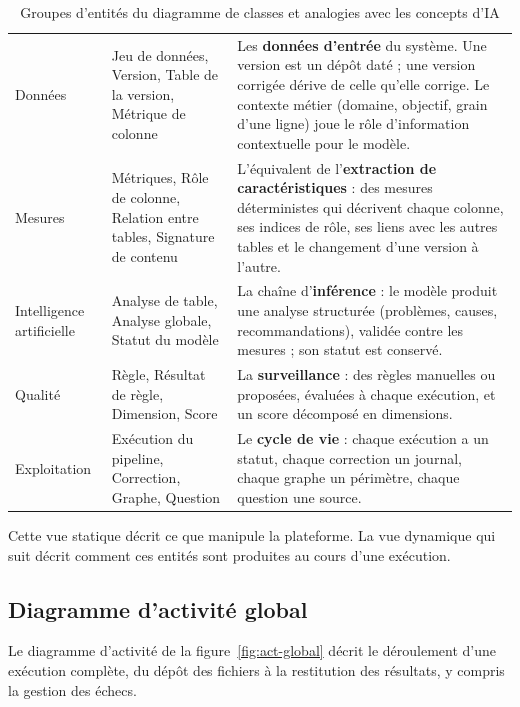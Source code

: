\begin{table}[H]
\centering
\small
\begin{tabular}{|L{2.8cm}|L{4.2cm}|L{7cm}|}
\hline
{} &  &  \\ \hline
Données & Jeu de données, Version, Table de la version, Métrique de colonne & Les \textbf{données d'entrée} du système. Une version est un dépôt daté ; une version corrigée dérive de celle qu'elle corrige. Le contexte métier (domaine, objectif, grain d'une ligne) joue le rôle d'information contextuelle pour le modèle. \\ \hline
Mesures & Métriques, Rôle de colonne, Relation entre tables, Signature de contenu & L'équivalent de l'\textbf{extraction de caractéristiques} : des mesures déterministes qui décrivent chaque colonne, ses indices de rôle, ses liens avec les autres tables et le changement d'une version à l'autre. \\ \hline
Intelligence artificielle & Analyse de table, Analyse globale, Statut du modèle & La chaîne d'\textbf{inférence} : le modèle produit une analyse structurée (problèmes, causes, recommandations), validée contre les mesures ; son statut est conservé. \\ \hline
Qualité & Règle, Résultat de règle, Dimension, Score & La \textbf{surveillance} : des règles manuelles ou proposées, évaluées à chaque exécution, et un score décomposé en dimensions. \\ \hline
Exploitation & Exécution du pipeline, Correction, Graphe, Question & Le \textbf{cycle de vie} : chaque exécution a un statut, chaque correction un journal, chaque graphe un périmètre, chaque question une source. \\ \hline
\end{tabular}
\caption{Groupes d'entités du diagramme de classes et analogies avec les concepts d'IA}
\label{tab:classes}
\end{table}

Cette vue statique décrit ce que manipule la plateforme. La vue dynamique qui suit décrit comment ces entités sont produites au cours d'une exécution.

\subsection{Diagramme d'activité global}

Le diagramme d'activité de la figure~\ref{fig:act-global} décrit le déroulement d'une exécution complète, du dépôt des fichiers à la restitution des résultats, y compris la gestion des échecs.

